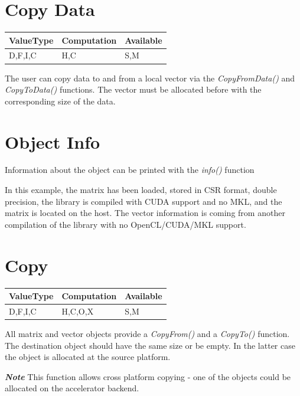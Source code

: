 \section{Copy Data}

\begin{table}[H]
\begin{tabular}{l|l|l}
\multicolumn{1}{c|}{ValueType} & Computation & Available \\ \hline
D,F,I,C                        & H,C          & S,M    
\end{tabular}
\end{table}

The user can copy data to and from a local vector via the \emph{CopyFromData()} and \emph{CopyToData()} functions. The vector must be allocated before with the corresponding size of the data. 


\section{Object Info}

Information about the object can be printed with the \emph{info()} function


In this example, the matrix has been loaded, stored in CSR format, double precision, the library is compiled with CUDA support and no MKL, and the matrix is located on the host. The vector information is coming from another compilation of the library with no OpenCL/CUDA/MKL support.

\section{Copy}

\begin{table}[H]
\begin{tabular}{l|l|l}
\multicolumn{1}{c|}{ValueType} & Computation & Available \\ \hline
D,F,I,C                        & H,C,O,X     & S,M    
\end{tabular}
\end{table}


All matrix and vector objects provide a \emph{CopyFrom()} and a \emph{CopyTo()} function. The destination object should have the same size or be empty. In the latter case the object is allocated at the source platform.

\textbf{\emph{Note}} This function allows cross platform copying - one of the objects could be allocated on the accelerator backend.


